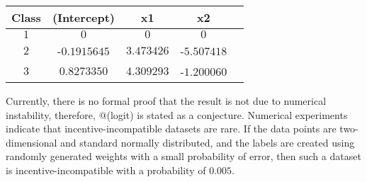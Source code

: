 \documentclass{article}
\begin{document}
\begin{center} \begin{tabular}{|c|c|c|c|c|}
\hline
 Class &(Intercept) &x1 &x2\\ \hline
$1$ &$0$ &$0$ &$0$\\ \hline
$2$ &-$0.1915645$ &$3.473426$ &-$5.507418$\\ \hline
$3$ &$0.8273350$ &$4.309293$ &-$1.200060$\\ \hline
\end{tabular} \end{center}
Currently, there is no formal proof that the result is not due to numerical instability, therefore, @(logit) is stated as a conjecture. Numerical experiments indicate that incentive-incompatible datasets are rare. If the data points are two-dimensional and standard normally distributed, and the labels are created using randomly generated weights with a small probability of error, then such a dataset is incentive-incompatible with a probability of $0.005$.
\newline \newline
\end{document}
